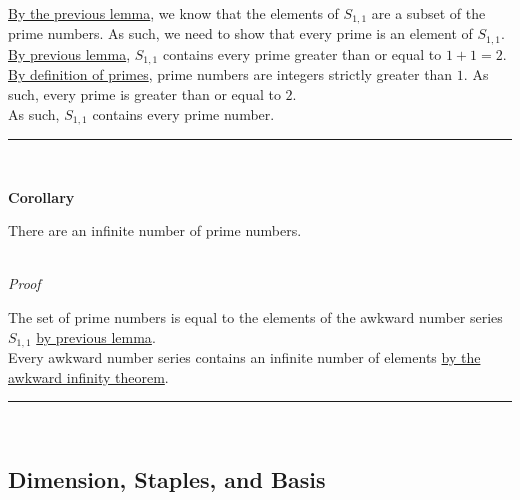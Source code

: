 \documentclass[a4paper,12pt]{article}
\begin{document}
\noindent \hyperlink{lemma:asn_subset_prime}{By the previous lemma}, we know that the elements of $S_{1, 1}$ are a subset of the prime numbers. As such, we need to show that every prime is an element of $S_{1, 1}$.\\

\noindent \hyperlink{lemma:primes_in_asn}{By previous lemma}, $S_{1, 1}$ contains every prime greater than or equal to $1 + 1 = 2$.\\

\noindent \hyperlink{definition:prime_numbers}{By definition of primes}, prime numbers are integers strictly greater than $1$. As such, every prime is greater than or equal to $2$.\\

\noindent As such, $S_{1, 1}$ contains every prime number.

\begin{center}
\noindent\rule{8cm}{0.4pt}
\end{center}
\noindent \\





\label{corollary:infinite_primes}
\hypertarget{corollary:infinite_primes}{}
\begin{tcolorbox}
\textbf{Corollary}

There are an infinite number of prime numbers.
\end{tcolorbox}

\noindent \\
\textit{Proof}

\noindent The set of prime numbers is equal to the elements of the awkward number series $S_{1, 1}$ \hyperlink{lemma:prime_asn}{by previous lemma}.\\

\noindent Every awkward number series contains an infinite number of elements \hyperlink{theorem:infinite_asn}{by the awkward infinity theorem}.

\begin{center}
\noindent\rule{8cm}{0.4pt}
\end{center}
\noindent \\








\subsection{Dimension, Staples, and Basis}
\end{document}
